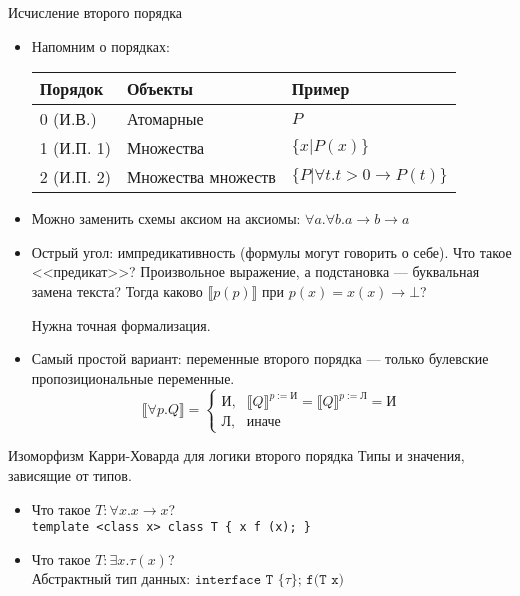 \documentclass[aspectratio=169]{beamer}
\begin{document}
\begin{frame}{Исчисление второго порядка}
\begin{itemize}
\item Напомним о порядках:

\begin{tabular}{lll}
Порядок & Объекты & Пример\\\hline
0 (И.В.) & Атомарные & $P$ \\
1 (И.П. 1) & Множества & $\{ x | P(x) \}$ \\
2 (И.П. 2) & Множества множеств & $\{ P | \forall t.t > 0 \rightarrow P(t) \}$
\end{tabular}\pause

\item Можно заменить схемы аксиом на аксиомы:
$\forall a.\forall b.a \rightarrow b \rightarrow a$\pause

\item
Острый угол: импредикативность (формулы могут говорить о себе). Что такое <<предикат>>? Произвольное выражение,
а подстановка --- буквальная замена текста? Тогда каково $\llbracket p(p) \rrbracket$ при 
$p(x) = x(x) \rightarrow \bot$?

\pause Нужна точная формализация.
\item Самый простой вариант: переменные второго порядка --- только булевские пропозициональные переменные. 
\pause
$$\llbracket\forall p.Q\rrbracket = \left\{\begin{array}{ll}\text{И}, & 
         \llbracket Q \rrbracket^{p := \text{И}} = \llbracket Q \rrbracket^{p := \text{Л}} = \text{И}\\
        \text{Л}, & \text{иначе}\end{array}\right.$$


\end{itemize}
\end{frame}


\begin{frame}{Изоморфизм Карри-Ховарда для логики второго порядка}
Типы и значения, зависящие от типов.
\begin{itemize}
\item Что такое $T: \forall x.x \rightarrow x$? \pause \\
 \texttt{template <class x> class T \{ x f (x); \}} \pause
\item Что такое $T: \exists x.\tau(x)$? \pause \\
 Абстрактный тип данных: $\texttt{interface T \{$\tau$\}; f(T x)}$
\end{itemize}
\end{frame}
\end{document}
